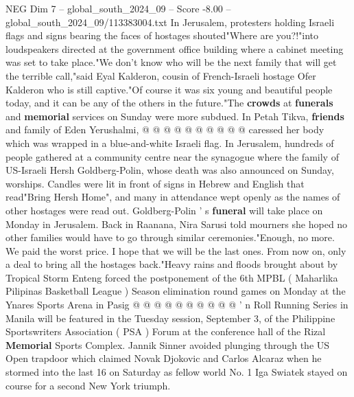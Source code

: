 \begin{textsample}{NEG Dim 7 – global\_south\_2024\_09 – Score -8.00 – global\_south\_2024\_09/113383004.txt}
In Jerusalem, protesters holding Israeli flags and signs bearing the faces of hostages shouted"Where are you?!"into loudspeakers directed at the government office building where a cabinet meeting was set to take place."We don't know who will be the next family that will get the terrible call,"said Eyal Kalderon, cousin of French-Israeli hostage Ofer Kalderon who is still captive."Of course it was six young and beautiful people today, and it can be any of the others in the future."The \textbf{crowds} at \textbf{funerals} and \textbf{memorial} services on Sunday were more subdued.
In Petah Tikva, \textbf{friends} and family of Eden Yerushalmi, @ @ @ @ @ @ @ @ @ @ caressed her body which was wrapped in a blue-and-white Israeli flag.
In Jerusalem, hundreds of people gathered at a community centre near the synagogue where the family of US-Israeli Hersh Goldberg-Polin, whose death was also announced on Sunday, worships.
Candles were lit in front of signs in Hebrew and English that read"Bring Hersh Home", and many in attendance wept openly as the names of other hostages were read out.
Goldberg-Polin ' s \textbf{funeral} will take place on Monday in Jerusalem.
Back in Raanana, Nira Sarusi told mourners she hoped no other families would have to go through similar ceremonies."Enough, no more.
We paid the worst price.
I hope that we will be the last ones.
From now on, only a deal to bring all the hostages back."Heavy rains and floods brought about by Tropical Storm Enteng forced the postponement of the 6th MPBL ( Maharlika Pilipinas Basketball League ) Season elimination round games on Monday at the Ynares Sports Arena in Pasig @ @ @ @ @ @ @ @ @ @ ' n Roll Running Series in Manila will be featured in the Tuesday session, September 3, of the Philippine Sportswriters Association ( PSA ) Forum at the conference hall of the Rizal \textbf{Memorial} Sports Complex.
Jannik Sinner avoided plunging through the US Open trapdoor which claimed Novak Djokovic and Carlos Alcaraz when he stormed into the last 16 on Saturday as fellow world No. 1 Iga Swiatek stayed on course for a second New York triumph.

\end{textsample}
